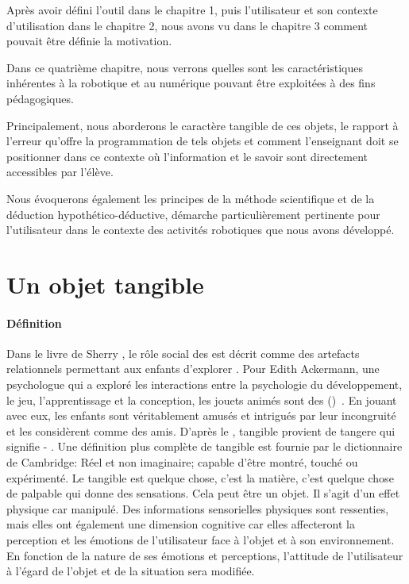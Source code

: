 \label{sec:peda}
\begin{resumChap}
Après avoir défini l'outil dans le chapitre 1, puis l'utilisateur et son contexte d'utilisation dans le chapitre 2, nous avons vu dans le chapitre 3 comment pouvait être définie la motivation.\par%
Dans ce quatrième chapitre, nous verrons quelles sont les caractéristiques inhérentes à la robotique et au numérique pouvant être exploitées à des fins pédagogiques.\par%
Principalement, nous aborderons le caractère tangible de ces objets, le rapport à l'erreur qu'offre la programmation de tels objets et comment l'enseignant doit se positionner dans ce contexte où l'information et le savoir sont directement accessibles par l'élève.\par%
Nous évoquerons également les principes de la méthode scientifique et de la déduction hypothético-déductive, démarche particulièrement pertinente pour l'utilisateur dans le contexte des activités robotiques que nous avons développé.
\end{resumChap}
\section{Un objet tangible}\label{sec:tangible}
    \paragraph{Définition}
        Dans le livre  de Sherry , le rôle social des  est décrit comme des artefacts relationnels permettant aux enfants d'explorer  . Pour Edith Ackermann, une psychologue qui a exploré les interactions entre la psychologie du développement, le jeu, l’apprentissage et la conception, les jouets animés sont des  ()~. En jouant avec eux, les enfants sont véritablement amusés et intrigués par leur incongruité et les considèrent comme des amis.
        D'après le , tangible provient de tangere qui signifie  - .
        Une définition plus complète de tangible est fournie par le dictionnaire de Cambridge:
        Réel et non imaginaire; capable d'être montré, touché ou expérimenté. 
        Le tangible est quelque chose, c'est la matière, c'est quelque chose de palpable qui donne des sensations. Cela peut être un objet. Il s’agit d’un effet physique car manipulé. Des informations sensorielles physiques sont ressenties, mais elles ont également une dimension cognitive car elles affecteront la perception et les émotions de l’utilisateur face à l’objet et à son environnement. En fonction de la nature de ses émotions et perceptions, l'attitude de l'utilisateur à l'égard de l'objet et de la situation sera modifiée.   
